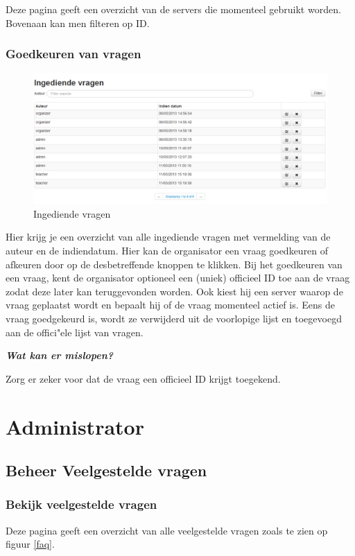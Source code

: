 \documentclass[]{article}
\begin{document}
Deze pagina geeft een overzicht van de servers die momenteel gebruikt worden. Bovenaan kan men filteren op ID. 

\subsubsection{Goedkeuren van vragen}

\begin{figure}[!ht]
	\centering
	\includegraphics[width=1\textwidth]{img/questionsubmits}
	\caption{Ingediende vragen}
	\label{questionsubmits}
\end{figure}

Hier krijg je een overzicht van alle ingediende vragen met vermelding van de auteur en de indiendatum. Hier kan de organisator een vraag goedkeuren of afkeuren door op de desbetreffende knoppen te klikken. Bij het goedkeuren van een vraag, kent de organisator optioneel een (uniek) officieel ID toe aan de vraag zodat deze later kan teruggevonden worden. Ook kiest hij een server waarop de vraag geplaatst wordt en bepaalt hij of de vraag momenteel actief is. Eens de vraag goedgekeurd is, wordt ze verwijderd uit de voorlopige lijst en toegevoegd aan de offici"ele lijst van vragen.

\textbf{\textit{Wat kan er mislopen?}}

Zorg er zeker voor dat de vraag een officieel ID krijgt toegekend.

\section{Administrator}

\subsection{Beheer Veelgestelde vragen}

\subsubsection{Bekijk veelgestelde vragen}
Deze pagina geeft een overzicht van alle veelgestelde vragen zoals te zien op figuur \ref{faq}.
\end{document}
